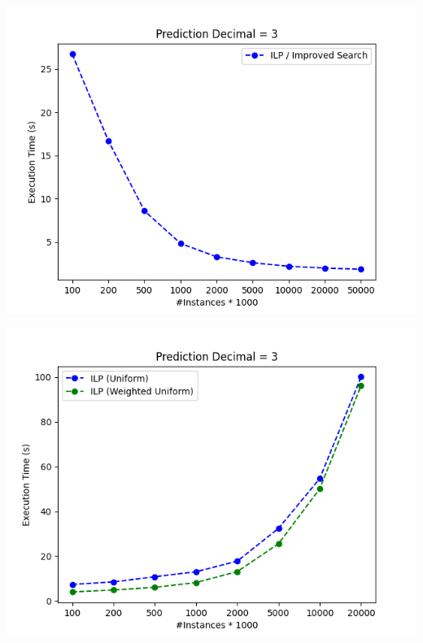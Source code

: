 \documentclass[a4paper]{article}
\begin{document}
\begin{center}
	\includegraphics[]{figure_4_temp}
\end{center}

\begin{center}
	\includegraphics[]{figure_5}
\end{center}

\pagebreak
\end{document}
